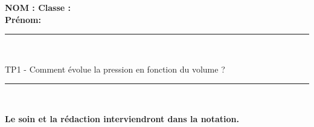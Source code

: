 \documentclass[11pt,a4paper]{article}
\begin{document}
\flushleft \textbf{NOM : \hfill Classe : \hspace{3cm} ~~\\[2mm]
Prénom:\\[0,4cm]
}
\hrule\
\\[0,2cm]

\begin{center}
 \LARGE{TP1 - Comment évolue la pression en fonction du volume ? }
\end{center}

\vspace{3 mm}

\normalsize

\hrule\
\\[0,2cm]
   \begin{center}
   \textbf{Le soin et la rédaction interviendront dans la notation.}
   \end{center} 

\vspace{4mm}
\end{document}
